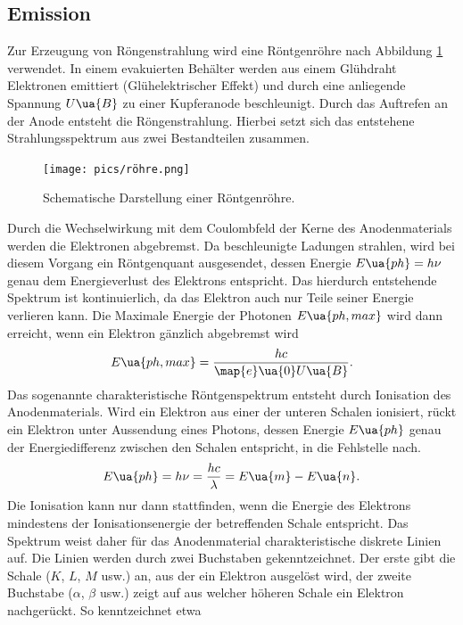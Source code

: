 \subsection{Emission}
Zur Erzeugung von Röngenstrahlung wird eine Röntgenröhre nach Abbildung \ref{fig: röhre} verwendet. In einem
evakuierten Behälter werden aus einem Glühdraht Elektronen emittiert (Glühelektrischer Effekt) und durch eine
anliegende Spannung $U\ua{B}$ zu einer Kupferanode beschleunigt. Durch das Auftrefen an der Anode
entsteht die Röngenstrahlung. Hierbei setzt sich das entstehene Strahlungsspektrum aus zwei
Bestandteilen zusammen.\\
\begin{figure}
  \centering
  \texttt{[image: pics/röhre.png]}
  \caption{Schematische Darstellung einer Röntgenröhre\cite{}.}
  \label{fig: röhre}
\end{figure}
Durch die Wechselwirkung mit dem Coulombfeld der Kerne des Anodenmaterials werden die Elektronen abgebremst. Da beschleunigte Ladungen strahlen, wird bei diesem
Vorgang ein Röntgenquant ausgesendet, dessen Energie $E\ua{ph} = h\nu$ genau dem Energieverlust des Elektrons
entspricht. Das hierdurch entstehende Spektrum ist kontinuierlich, da das Elektron auch nur Teile seiner
Energie verlieren kann. Die Maximale Energie der Photonen $E\ua{ph, max}$ wird dann erreicht,
wenn ein Elektron gänzlich abgebremst wird
\begin{equation}
  E\ua{ph, max} = \frac{h c}{\map{e}\ua{0}U\ua{B}}.
  \label{eq: E_max}
\end{equation}
Das sogenannte charakteristische Röntgenspektrum entsteht durch Ionisation des Anodenmaterials.
Wird ein Elektron aus einer der unteren Schalen ionisiert, rückt ein Elektron unter Aussendung eines
Photons, dessen Energie $E\ua{ph}$ genau der Energiedifferenz zwischen den Schalen entspricht, in die Fehlstelle nach.
\begin{equation}
  E\ua{ph} = h\nu = \frac{h c}{\lambda} = E\ua{m} - E\ua{n}.
  \label{eq: photonenenergie}
\end{equation}
Die Ionisation kann nur dann stattfinden, wenn die Energie des Elektrons mindestens der Ionisationsenergie der betreffenden Schale entspricht.
Das Spektrum weist daher für das Anodenmaterial charakteristische diskrete Linien auf. Die Linien werden durch zwei Buchstaben
gekenntzeichnet. Der erste gibt die Schale ($K$, $L$, $M$ usw.) an, aus der ein Elektron ausgelöst wird, der zweite Buchstabe
($\alpha$, $\beta$ usw.) zeigt auf aus welcher höheren Schale ein Elektron nachgerückt. So kenntzeichnet etwa
